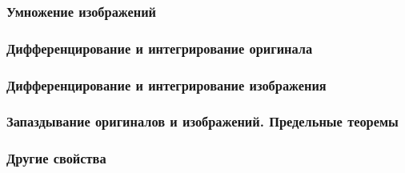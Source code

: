 \documentclass[12pt, a4paper]{article}
\begin{document}
\subsubsection{Умножение изображений}


\subsubsection{Дифференцирование и интегрирование оригинала}


\subsubsection{Дифференцирование и интегрирование изображения}


\subsubsection{Запаздывание оригиналов и изображений. Предельные теоремы}


\subsubsection{Другие свойства}

\newpage
\end{document}
